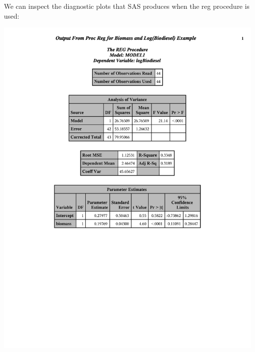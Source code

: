 We can inspect the diagnostic plots that SAS produces when the reg procedure is used:
\begin{center}
\includegraphics[scale=0.7,page=2,trim= 10mm 70mm 10mm 10mm]{slrbiodiesel}\\

\end{center}
